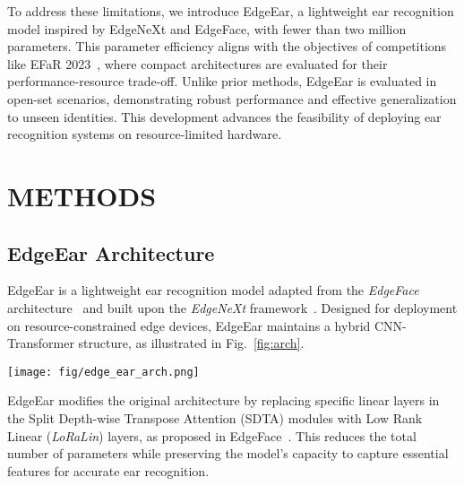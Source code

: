 \documentclass[a4paper, 10pt, conference]{ieeeconf}
\begin{document}
To address these limitations, we introduce EdgeEar, a lightweight ear recognition model inspired by EdgeNeXt and EdgeFace, with fewer than two million parameters. This parameter efficiency aligns with the objectives of competitions like EFaR 2023~\cite{Kolf2023EFaR}, where compact architectures are evaluated for their performance-resource trade-off. Unlike prior methods, EdgeEar is evaluated in open-set scenarios, demonstrating robust performance and effective generalization to unseen identities. This development advances the feasibility of deploying ear recognition systems on resource-limited hardware.



\section{METHODS}

\subsection{EdgeEar Architecture}

EdgeEar is a lightweight ear recognition model adapted from the \textit{EdgeFace} architecture~\cite{George_IEEETBIOM_2024} and built upon the \textit{EdgeNeXt} framework~\cite{Maaz_edgenext}. Designed for deployment on resource-constrained edge devices, EdgeEar maintains a hybrid CNN-Transformer structure, as illustrated in Fig.~\ref{fig:arch}.

\begin{figure*}[ht!]
    \centering
    \texttt{[image: fig/edge\_ear\_arch.png]}
    \caption{Schematic diagram of the proposed EdgeEar model, adapted from the EdgeFace~\cite{George_IEEETBIOM_2024} and EdgeNeXt~\cite{Maaz_edgenext} architectures. The modifications include \textit{selectively} applying \textit{LoRaLin} layers (highlighted in red) to three layers of the Stage~4 SDTA Encoder, while retaining full-rank linear layers for the remaining layers. }
    \label{fig:arch}
\end{figure*}

EdgeEar modifies the original architecture by replacing specific linear layers in the Split Depth-wise Transpose Attention (SDTA) modules with Low Rank Linear (\textit{LoRaLin}) layers, as proposed in EdgeFace~\cite{George_IEEETBIOM_2024}. This reduces the total number of parameters while preserving the model's capacity to capture essential features for accurate ear recognition.
\end{document}
